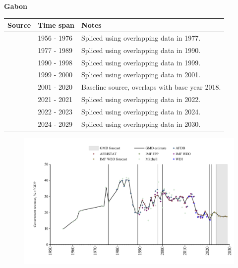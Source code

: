 \documentclass[12pt,a4paper,landscape]{article}
\begin{document}
\begin{adjustbox}{max totalsize={\paperwidth}{\paperheight},center}
\begin{minipage}[t][\textheight][t]{\textwidth}
\vspace*{0.5cm}
{}
\begin{center}
{\Large\bfseries Gabon}
\end{center}
\vspace{0.5cm}
\begin{table}[H]
\centering
\small
\begin{tabular}{|l|l|l|}
\hline
\textbf{Source} & \textbf{Time span} & \textbf{Notes} \\
\hline
\rowcolor{white}\cite{Mitchell}& 1956 - 1976 &Spliced using overlapping data in 1977.\\
\rowcolor{lightgray}\cite{AFDB}& 1977 - 1989 &Spliced using overlapping data in 1990.\\
\rowcolor{white}\cite{AFRISTAT}& 1990 - 1998 &Spliced using overlapping data in 1999.\\
\rowcolor{lightgray}\cite{AFDB}& 1999 - 2000 &Spliced using overlapping data in 2001.\\
\rowcolor{white}\cite{AFRISTAT}& 2001 - 2020 &Baseline source, overlaps with base year 2018.\\
\rowcolor{lightgray}\cite{WDI}& 2021 - 2021 &Spliced using overlapping data in 2022.\\
\rowcolor{white}\cite{IMF_FPP}& 2022 - 2023 &Spliced using overlapping data in 2024.\\
\rowcolor{lightgray}\cite{IMF_WEO_forecast}& 2024 - 2029 &Spliced using overlapping data in 2030.\\
\hline
\end{tabular}
\end{table}
\begin{figure}[H]
\centering
\includegraphics[width=\textwidth,height=0.6\textheight,keepaspectratio]{graphs/GAB_govrev_GDP.pdf}
\end{figure}
\end{minipage}
\end{adjustbox}
\end{document}
